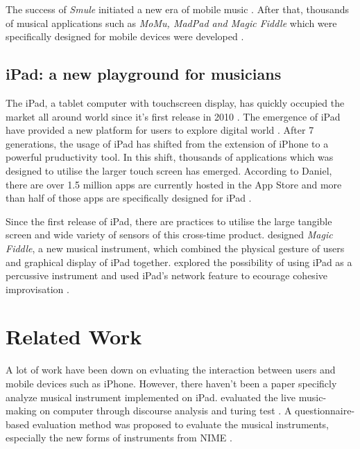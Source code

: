 The success of \textit{Smule} initiated a new era of mobile music \citep{Reference8}. After that, thousands of musical applications such as \textit{MoMu, MadPad and Magic Fiddle} which were specifically designed for mobile devices were developed \citep{Reference8.2,Reference8.3,Reference8.4}.



\subsection{iPad: a new playground for musicians}

The iPad, a tablet computer with touchscreen display, has quickly occupied the market all around world since it's first release in 2010 \citep{Reference2}. The emergence of iPad have provided a new platform for users to explore digital world \citep{Reference1}. After 7 generations, the usage of iPad has shifted from the extension of iPhone to a powerful pruductivity tool. In this shift, thousands of applications which was designed to utilise the larger touch screen has emerged. According to Daniel, there are over 1.5 million apps are currently hosted in the App Store and more than half of those apps are specifically designed for iPad \citep{lifewire}.

Since the first release of iPad, there are practices to utilise the large tangible screen and wide variety of sensors of this cross-time product. \citeauthor{Reference8.4} designed \textit{Magic Fiddle}, a new musical instrument, which combined the physical gesture of users and graphical display of iPad together. \citeauthor{Reference19} explored the possibility of using iPad as a percussive instrument and used iPad's network feature to ecourage cohesive improvisation \citep{Reference19}.

\section{Related Work}

A lot of work have been down on evluating the interaction between users and mobile devices such as iPhone. However, there haven't been a paper specificly analyze musical instrument implemented on iPad. \citeauthor{Reference21} evaluated the live music-making on computer through discourse analysis and turing test \citep{Reference21}. A questionnaire-based evaluation method was proposed to evaluate the musical instruments, especially the new forms of instruments from NIME \citep{Reference0}.

